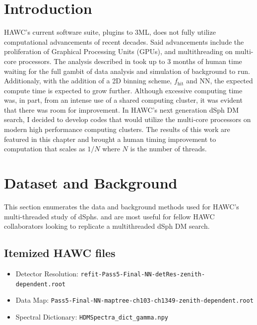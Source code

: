 \section{Introduction}\label{sec:mtd_intro}

HAWC's current software suite, plugins to 3ML, does not fully utilize computational advancements of recent decades.
Said advancements include the proliferation of Graphical Processing Units (GPUs), and multithreading on multi-core processors.
The analysis described in  took up to 3 months of human time waiting for the full gambit of data analysis and simulation of background to run.
Additionaly, with the addition of a 2D binning scheme, $f_\mathrm{hit}$ and NN, the expected compute time is expected to grow further.
Although excessive computing time was, in part, from an intense use of a shared computing cluster, it was evident that there was room for improvement.
In HAWC's next generation dSph DM search, I decided to develop codes that would utilize the multi-core processors on modern high performance computing clusters.
The results of this work are featured in this chapter and brought a human timing improvement to computation that scales as $1/N$ where $N$ is the number of threads.

\section{Dataset and Background}\label{sec:mtd_databgd}

This section enumerates the data and background methods used for HAWC's multi-threaded study of dSphs.
 and  are most useful for fellow HAWC collaborators looking to replicate a multithreaded dSph DM search.

\subsection{Itemized HAWC files}\label{sec:mtd_data}

\begin{itemize}
    \item Detector Resolution: \texttt{refit-Pass5-Final-NN-detRes-zenith-dependent.root}
    \item Data Map: \texttt{Pass5-Final-NN-maptree-ch103-ch1349-zenith-dependent.root}
    \item Spectral Dictionary: \texttt{HDMSpectra\_dict\_gamma.npy}
\end{itemize}

